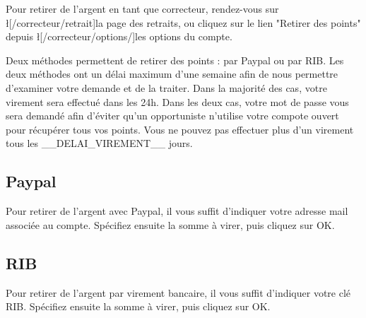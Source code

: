 ﻿Pour retirer de l'argent en tant que correcteur, rendez-vous sur \l[/correcteur/retrait]{la page des retraits}, ou cliquez sur le lien "Retirer des points" depuis \l[/correcteur/options/]{les options du compte}.

Deux méthodes permettent de retirer des points : par Paypal ou par RIB.
Les deux méthodes ont un délai maximum d'une semaine afin de nous permettre d'examiner votre demande et de la traiter. Dans la majorité des cas, votre virement sera effectué dans les 24h.
Dans les deux cas, votre mot de passe vous sera demandé afin d'éviter qu'un opportuniste n'utilise votre compote ouvert pour récupérer tous vos points.
Vous ne pouvez pas effectuer plus d'un virement tous les __DELAI_VIREMENT__ jours.

\subsection{Paypal}
Pour retirer de l'argent avec Paypal, il vous suffit d'indiquer votre adresse mail associée au compte.
Spécifiez ensuite la somme à virer, puis cliquez sur OK.

\subsection{RIB}
Pour retirer de l'argent par virement bancaire, il vous suffit d'indiquer votre clé RIB.
Spécifiez ensuite la somme à virer, puis cliquez sur OK.